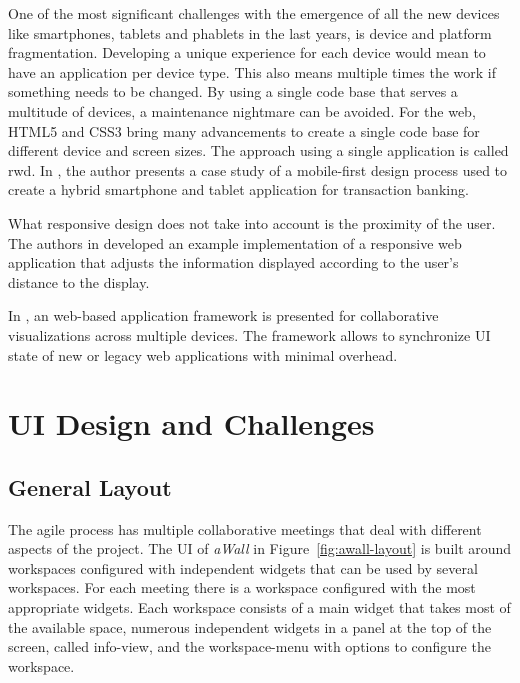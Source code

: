 \documentclass{sigchi}
\begin{document}
One of the most significant challenges with the emergence of all the new devices like smartphones, tablets and phablets in the last years, is device and platform fragmentation.
Developing a unique experience for each device would mean to have an application per device type.
This also means multiple times the work if something needs to be changed. 
By using a single code base that serves a multitude of devices, a maintenance nightmare can be avoided.
For the web, HTML5 and CSS3 bring many advancements to create a single code base for different device and screen sizes.
The approach using a single application is called \gls{rwd}.
In \cite{Pandey:2013:RDT:2525194.2525271}, the author presents a case study of a mobile-first design process used to create a hybrid smartphone and tablet application for transaction banking.

What responsive design does not take into account is the proximity of the user. 
The authors in \cite{Sukale:2014:PWD:2638728.2638768} developed an example implementation of a responsive web application that adjusts the information displayed according to the user's distance to the display.

In \cite{Badam:2014:PCF:2669485.2669518}, an web-based application framework is presented for collaborative visualizations across multiple devices. The framework allows to synchronize UI state of new or legacy web applications with minimal overhead.


\section{UI Design and Challenges}
\subsection{General Layout}
The agile process has multiple collaborative meetings that deal with different aspects of the project.
The UI of \textit{aWall} in Figure~\ref{fig:awall-layout} is built around workspaces configured with independent widgets that can be used by several workspaces.
For each meeting there is a workspace configured with the most appropriate widgets.
Each workspace consists of a main widget that takes most of the available space, numerous independent widgets in a panel at the top of the screen, called info-view, and the workspace-menu with options to configure the workspace.
\end{document}
